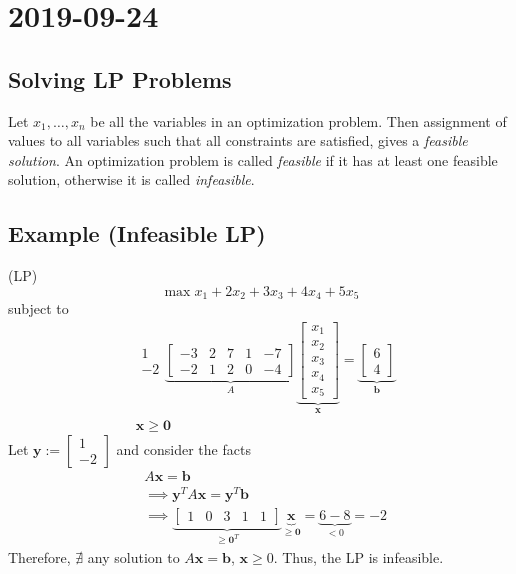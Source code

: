 \section{2019-09-24}
\subsection{Solving LP Problems}
Let $x_1,\dots,x_n$ be all the variables in an optimization problem. Then
assignment of values to all variables such that all constraints are satisfied,
gives a \emph{feasible solution}. An optimization problem is called \emph{feasible}
if it has at least one feasible solution, otherwise it is called \emph{infeasible}.

\subsection{Example (Infeasible LP)}
(LP)
\[\max x_1+2x_2+3x_3+4x_4+5x_5\]
subject to
\begin{align*}
    &
    \begin{matrix}
    1\\
    -2
    \end{matrix}
    \underbrace{
        \begin{bmatrix}
        -3 & 2 & 7 & 1 & -7 \\
        -2 & 1 & 2 & 0 & -4
        \end{bmatrix}}_{A}
    \underbrace{\begin{bmatrix}
        x_1\\
        x_2\\
        x_3\\
        x_4\\
        x_5
    \end{bmatrix}}_{\mathbf{x}}
    =
    \underbrace{\begin{bmatrix}
        6\\
        4
    \end{bmatrix}}_{\mathbf{b}}\\
    &\mathbf{x}\ge \mathbf{0}
\end{align*}
Let $\mathbf{y}:=
\begin{bmatrix}
    1\\
    -2
\end{bmatrix}$
and consider the facts
\begin{align*}
    &A\mathbf{x}=\mathbf{b}\\
    &\implies \mathbf{y}^TA\mathbf{x}=\mathbf{y}^T\mathbf{b}\\
    &\implies \underbrace{\begin{bmatrix}
        1 & 0 & 3 & 1 & 1
    \end{bmatrix}}_{\ge \mathbf{0}^T}
    \underbrace{\mathbf{x}}_{\ge \mathbf{0}}=\underbrace{6-8}_{< 0}=-2
\end{align*}
Therefore, $\nexists$ any solution to $A\mathbf{x}=\mathbf{b}$, $\mathbf{x}\ge 0$.
Thus, the LP is infeasible.

